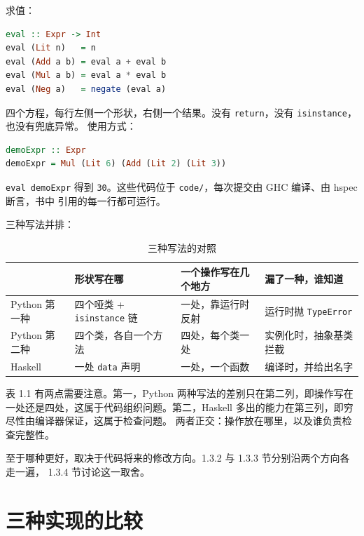 求值：

\begin{lstlisting}[language=Haskell]
eval :: Expr -> Int
eval (Lit n)   = n
eval (Add a b) = eval a + eval b
eval (Mul a b) = eval a * eval b
eval (Neg a)   = negate (eval a)
\end{lstlisting}

四个方程，每行左侧一个形状，右侧一个结果。没有 \passthrough{\lstinline!return!}，没有 \passthrough{\lstinline!isinstance!}，也没有兜底异常。
使用方式：

\begin{lstlisting}[language=Haskell]
demoExpr :: Expr
demoExpr = Mul (Lit 6) (Add (Lit 2) (Lit 3))
\end{lstlisting}

\passthrough{\lstinline!eval demoExpr!} 得到 \passthrough{\lstinline!30!}。这些代码位于 \passthrough{\lstinline!code/!}，每次提交由 GHC 编译、由 hspec 断言，书中
引用的每一行都可运行。

三种写法并排：

{\small\setlength{\tabcolsep}{4pt} %
\begin{longtable}[]{@{}
  l
  l
  l
  l@{}}
\caption{三种写法的对照}\label{tab:1-1}\\
\toprule\noalign{}
\textbf{} & \textbf{形状写在哪} & \textbf{一个操作写在几个地方} & \textbf{漏了一种，谁知道} \\
\midrule\noalign{}
\endhead
\bottomrule\noalign{}
\endlastfoot
Python 第一种 & 四个哑类 + \passthrough{\lstinline!isinstance!} 链 & 一处，靠运行时反射 & 运行时抛 \passthrough{\lstinline!TypeError!} \\
Python 第二种 & 四个类，各自一个方法 & 四处，每个类一处 & 实例化时，抽象基类拦截 \\
Haskell & 一处 \passthrough{\lstinline!data!} 声明 & 一处，一个函数 & 编译时，并给出名字 \\
\end{longtable}
}

表 1.1 有两点需要注意。第一，Python 两种写法的差别只在第二列，即操作写在一处还是四处，这属于代码组织问题。第二，Haskell 多出的能力在第三列，即穷尽性由编译器保证，这属于检查问题。
两者正交：操作放在哪里，以及谁负责检查完整性。

至于哪种更好，取决于代码将来的修改方向。1.3.2 与 1.3.3 节分别沿两个方向各走一遍，
1.3.4 节讨论这一取舍。

\section{三种实现的比较}\label{ux4e09ux79cdux5b9eux73b0ux7684ux6bd4ux8f83}

